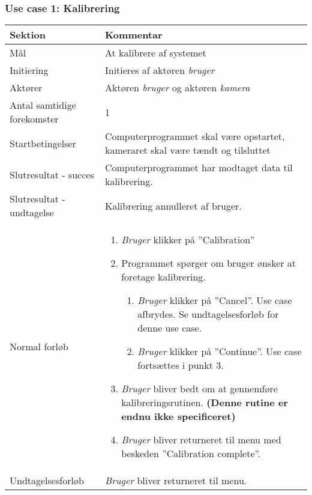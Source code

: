 \documentclass[kravspec.tex]{subfiles}
\begin{document}
	\subsubsection{Use case 1: Kalibrering}
	\begin{tabular}{|l|p{7.7cm}|}
		\hline \textbf{Sektion} & \textbf{Kommentar} \\ 
		\hline Mål & At kalibrere af systemet \\ 
		\hline Initiering & Initieres af aktøren \textit{bruger} \\ 
		\hline Aktører & Aktøren \textit{bruger} og aktøren \textit{kamera} \\ 
		\hline Antal samtidige forekomster & 1 \\ 
		\hline Startbetingelser & Computerprogrammet skal være opstartet, kameraret skal være tændt og tilsluttet \\ 	
		\hline Slutresultat - succes & Computerprogrammet har modtaget data til kalibrering. \\ 
		\hline Slutresultat - undtagelse &  Kalibrering annulleret af bruger. \\ 
		\hline Normal forløb & \begin{enumerate}
			\item \textit{Bruger} klikker på ”Calibration”
			\item Programmet spørger om bruger ønsker at foretage kalibrering.
			\begin{enumerate}
				\item \textit{Bruger} klikker på ”Cancel”.
				Use case afbrydes.
				Se undtagelsesforløb for denne use case.
				\item \textit{Bruger} klikker på ”Continue”. 
				Use case fortsættes i punkt 3.
			\end{enumerate}
			\item \textit{Bruger} bliver bedt om at gennemføre kalibreringsrutinen.  \textbf{(Denne rutine er endnu ikke specificeret) }
			\item \textit{Bruger} bliver returneret til menu med beskeden ”Calibration complete”.

		\end{enumerate} \\ 
		\hline Undtagelsesforløb & \textit{Bruger} bliver returneret til menu.  \\ 
		\hline 
	\end{tabular} \\ \\
	
\end{document}
